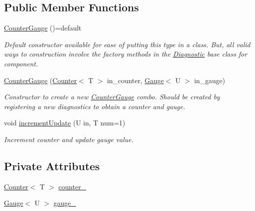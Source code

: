 \subsection*{Public Member Functions}
\begin{DoxyCompactItemize}
\item 
\hyperlink{structvt_1_1runtime_1_1component_1_1meter_1_1_counter_gauge_a22b5d98866d327cd9c353f7cd38677a4}{Counter\+Gauge} ()=default
\begin{DoxyCompactList}\small\item\em Default constructor available for ease of putting this type in a class. But, all valid ways to construction involve the factory methods in the {\ttfamily \hyperlink{structvt_1_1runtime_1_1component_1_1_diagnostic}{Diagnostic}} base class for component. \end{DoxyCompactList}\item 
\hyperlink{structvt_1_1runtime_1_1component_1_1meter_1_1_counter_gauge_aef09c6fc19fce8cf4cc878539c05bad8}{Counter\+Gauge} (\hyperlink{structvt_1_1runtime_1_1component_1_1meter_1_1_counter}{Counter}$<$ T $>$ in\+\_\+counter, \hyperlink{structvt_1_1runtime_1_1component_1_1meter_1_1_gauge}{Gauge}$<$ U $>$ in\+\_\+gauge)
\begin{DoxyCompactList}\small\item\em Constructor to create a new {\ttfamily \hyperlink{structvt_1_1runtime_1_1component_1_1meter_1_1_counter_gauge}{Counter\+Gauge}} combo. Should be created by registering a new diagnostics to obtain a counter and gauge. \end{DoxyCompactList}\item 
void \hyperlink{structvt_1_1runtime_1_1component_1_1meter_1_1_counter_gauge_adc7bd49ecd93e675f4e8e18c6f11853f}{increment\+Update} (U in, T num=1)
\begin{DoxyCompactList}\small\item\em Increment counter and update gauge value. \end{DoxyCompactList}\end{DoxyCompactItemize}
\subsection*{Private Attributes}
\begin{DoxyCompactItemize}
\item 
\hyperlink{structvt_1_1runtime_1_1component_1_1meter_1_1_counter}{Counter}$<$ T $>$ \hyperlink{structvt_1_1runtime_1_1component_1_1meter_1_1_counter_gauge_a633dac04bd7b420a158ce12e36afb320}{counter\+\_\+}
\item 
\hyperlink{structvt_1_1runtime_1_1component_1_1meter_1_1_gauge}{Gauge}$<$ U $>$ \hyperlink{structvt_1_1runtime_1_1component_1_1meter_1_1_counter_gauge_a76c78392b6cc713038031300eb00e86c}{gauge\+\_\+}
\end{DoxyCompactItemize}

